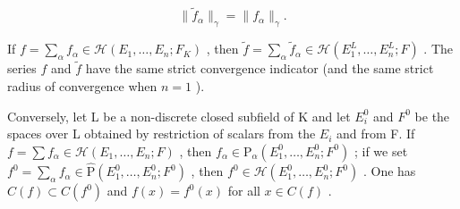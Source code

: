 \[
\| \tilde {f} _ {\alpha} \| _ {\gamma} = \| f _ {\alpha} \| _ {\gamma}.
\]

If \(f = \sum_{\alpha} f_{\alpha} \in \mathcal{H}(E_1, \ldots, E_n; F_K)\) , then \(\tilde{f} = \sum_{\alpha} \tilde{f}_{\alpha} \in \mathcal{H}(E_1^L, \ldots, E_n^L; F)\) . The series \(f\) and \(\tilde{f}\) have the same strict convergence indicator (and the same strict radius of convergence when \(n = 1\) ).

Conversely, let L be a non-discrete closed subfield of K and let \(E_{i}^{0}\) and \(F^{0}\) be the spaces over L obtained by restriction of scalars from the \(E_{i}\) and from F. If \(f = \sum f_{\alpha} \in \mathcal{H}(E_{1}, \ldots, E_{n}; F)\) , then \(f_{\alpha} \in \mathrm{P}_{\alpha}(E_{1}^{0}, \ldots, E_{n}^{0}; F^{0})\) ; if we set \(f^{0} = \sum_{\alpha} f_{\alpha} \in \hat{\mathrm{P}}(E_{1}^{0}, \ldots, E_{n}^{0}; F^{0})\) , then \(f^{0} \in \mathcal{H}(E_{1}^{0}, \ldots, E_{n}^{0}; F^{0})\) . One has \(C(f) \subset C(f^{0})\) and \(f(x) = f^{0}(x)\) for all \(x \in C(f)\) .

